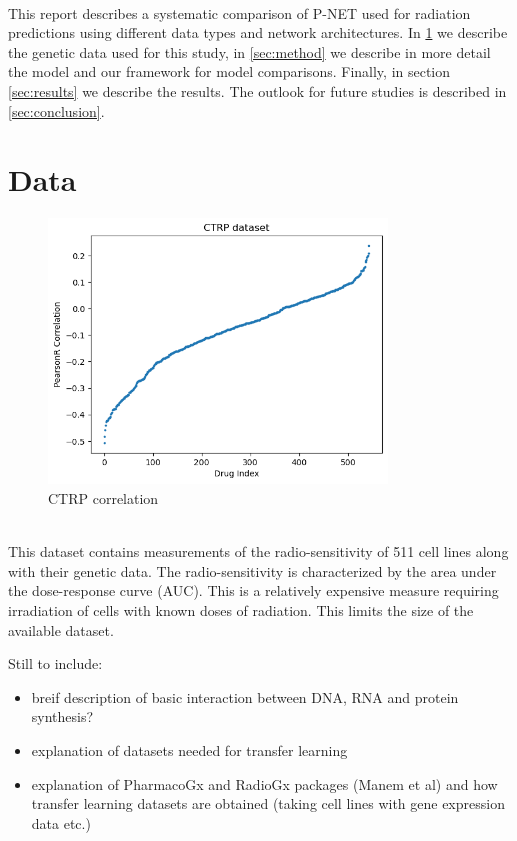 \documentclass[NOTE, disdraft=true, UKenglish]{\DISCDTLATEXPATH UCLCDTDISdoc}
\begin{document}
\\ \indent 
This report describes a systematic comparison of P-NET used for radiation predictions using different data types and network architectures. 
In \ref{sec:data} we describe the genetic data used for this study, in \ref{sec:method} we describe in more detail the model and our framework for model comparisons. Finally, in section \ref{sec:results} we describe the results. The outlook for future studies is described in \ref{sec:conclusion}.
 
%
\section{Data}
\label{sec:data}


\begin{figure}
    \centering
    \includegraphics[width=9cm]{Figures/CTRP_correlation.png}
    \caption{CTRP correlation}
    \label{CTRP correlation}
\end{figure}

\\ \indent 
This dataset contains measurements \cite{yard} of the radio-sensitivity of 511 cell lines along with their genetic data.
The radio-sensitivity is characterized by the area under the dose-response curve (AUC). 
This is a relatively expensive measure requiring irradiation of cells with known doses of radiation. This limits the size of the available dataset. 


{   \color{red}
Still to include:
\begin{itemize}
\item breif description of basic interaction between DNA, RNA and protein synthesis?
\item explanation of datasets needed for transfer learning
\item explanation of PharmacoGx and RadioGx packages (Manem et al) and how transfer learning datasets are obtained (taking cell lines with gene expression data etc.)
\end{itemize}}
\end{document}
